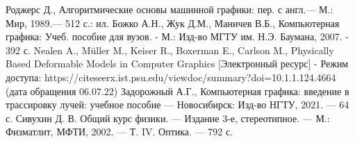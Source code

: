 \begin{thebibliography}{}
	 Роджерс Д., Алгоритмические основы машинной графики: пер. с англ.—
	М.: Мир, 1989.— 512 с.: ил.
	 Божко А.Н., Жук Д.М., Маничев В.Б., Компьютерная графика: Учеб.
	пособие для вузов. - М.: Изд-во МГТУ им. Н.Э. Баумана, 2007. - 392 с.
	 Nealen A., Müller M., Keiser R., Boxerman E., Carlson M., Physically Based
	Deformable Models in Computer Graphics [Электронный ресурс] - Режим доступа:
	https://citeseerx.ist.psu.edu/viewdoc/summary?doi=10.1.1.124.4664 (дата обращения
	06.07.22)
	 Задорожный А.Г., Компьютерная графика: введение в трассировку лучей:
	учебное пособие — Новосибирск: Изд-во НГТУ, 2021. — 64 с.
	 Сивухин Д. В. Общий курс физики. — Издание 3-е, стереотипное. — М.:
	Физматлит, МФТИ, 2002. — Т. IV. Оптика. — 792 с.
\end{thebibliography}
